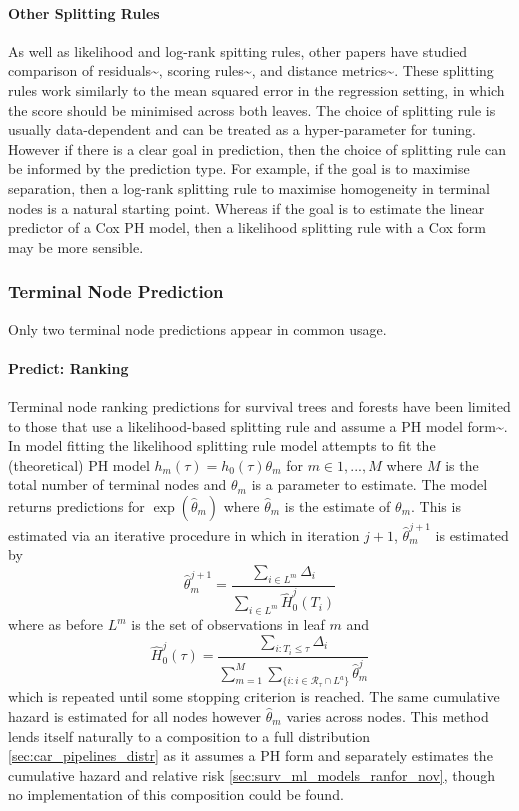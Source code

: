 \documentclass[
  letterpaper,
]{scrbook}
\let\oldparagraph\paragraph
\renewcommand{\paragraph}[1]{\oldparagraph{#1}\mbox{}}
\theoremstyle{plain}
\theoremstyle{definition}
\theoremstyle{remark}
\begin{document}
\paragraph{Other Splitting Rules}

As well as likelihood and log-rank spitting rules, other papers have
studied comparison of residuals\textasciitilde{}\cite{Therneau1990},
scoring rules\textasciitilde{}\cite{pkgrfsrc}, and distance
metrics\textasciitilde{}\cite{Gordon1985}. These splitting rules work
similarly to the mean squared error in the regression setting, in which
the score should be minimised across both leaves. The choice of
splitting rule is usually data-dependent and can be treated as a
hyper-parameter for tuning. However if there is a clear goal in
prediction, then the choice of splitting rule can be informed by the
prediction type. For example, if the goal is to maximise separation,
then a log-rank splitting rule to maximise homogeneity in terminal nodes
is a natural starting point. Whereas if the goal is to estimate the
linear predictor of a Cox PH model, then a likelihood splitting rule
with a Cox form may be more sensible.

\subsubsection{Terminal Node Prediction}
\label{sec:surv_ml_models_ranfor_nodes}

Only two terminal node predictions appear in common usage.

\paragraph{Predict: Ranking}

Terminal node ranking predictions for survival trees and forests have
been limited to those that use a likelihood-based splitting rule and
assume a PH model form\textasciitilde{}\cite{Ishwaran2004, LeBlanc1992}.
In model fitting the likelihood splitting rule model attempts to fit the
(theoretical) PH model \(h_m(\tau) = h_0(\tau)\theta_m\) for
\(m \in 1,...,M\) where \(M\) is the total number of terminal nodes and
\(\theta_m\) is a parameter to estimate. The model returns predictions
for \(\exp(\hat{\theta}_m)\) where \(\hat{\theta}_m\) is the estimate of
\(\theta_m\). This is estimated via an iterative procedure in which in
iteration \(j+1\), \(\hat{\theta}_m^{j+1}\) is estimated by \[
\hat{\theta}_m^{j+1} = \frac{\sum_{i \in L^m} \Delta_i}{\sum_{i \in L^m} \hat{H}^j_0(T_i)}
\] where as before \(L^m\) is the set of observations in leaf \(m\) and
\[
\hat{H}^{j}_0(\tau) = \frac{\sum_{i:T_i \leq \tau} \Delta_i}{\sum_{m = 1}^M\sum_{\{i:i \in \mathcal{R}_\tau \cap L^a\}} \hat{\theta}^{j}_m}
\] which is repeated until some stopping criterion is reached. The same
cumulative hazard is estimated for all nodes however \(\hat{\theta}_m\)
varies across nodes. This method lends itself naturally to a composition
to a full distribution \ref{sec:car_pipelines_distr} as it assumes a PH
form and separately estimates the cumulative hazard and relative risk
\ref{sec:surv_ml_models_ranfor_nov}, though no implementation of this
composition could be found.
\end{document}
